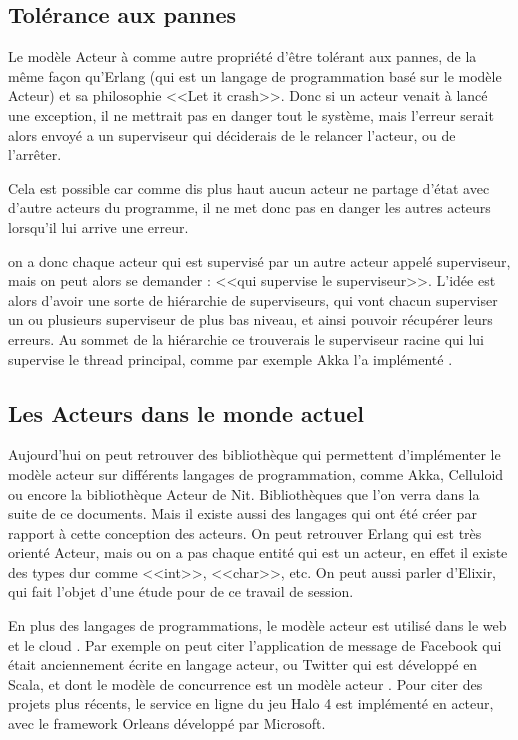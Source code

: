 \documentclass[12pt, a4paper]{article}
\begin{document}
\subsection{Tolérance aux pannes}
Le modèle Acteur à comme autre propriété d'être tolérant aux pannes, de la même façon qu'Erlang (qui est un langage de programmation basé sur le modèle Acteur) et sa philosophie <<Let it crash>>. Donc si un acteur venait à lancé une exception, il ne mettrait pas en danger tout le système, mais l'erreur serait alors envoyé a un superviseur qui déciderais de le relancer l'acteur, ou de l’arrêter.
\par Cela est possible car comme dis plus haut aucun acteur ne partage d'état avec d'autre acteurs du programme, il ne met donc pas en danger les autres acteurs lorsqu'il lui arrive une erreur.
\par on a donc chaque acteur qui est supervisé par un autre acteur appelé superviseur, mais on peut alors se demander : <<qui supervise le superviseur>>. L'idée est alors d'avoir une sorte de hiérarchie de superviseurs, qui vont chacun superviser un ou plusieurs superviseur de plus bas niveau, et ainsi pouvoir récupérer leurs erreurs. Au sommet de la hiérarchie ce trouverais le superviseur racine qui lui supervise le thread principal, comme par exemple Akka l'a implémenté \cite{akka}.

\subsection{Les Acteurs dans le monde actuel}
Aujourd'hui on peut retrouver des bibliothèque qui permettent d'implémenter le modèle acteur sur différents langages de programmation, comme Akka, Celluloid ou encore la bibliothèque Acteur de Nit. Bibliothèques que l'on verra dans la suite de ce documents. Mais il existe aussi des langages qui ont été créer par rapport à cette conception des acteurs. On peut retrouver Erlang qui est très orienté Acteur, mais ou on a pas chaque entité qui est un acteur, en effet il existe des types dur comme <<int>>, <<char>>, etc. On peut aussi parler d’Elixir, qui fait l'objet d'une étude pour de ce travail de session.
\par En plus des langages de programmations, le modèle acteur est utilisé dans le web et le cloud \cite{agha2014actors,vecchiola2009high}. Par exemple on peut citer l'application de message de Facebook qui était anciennement écrite en langage acteur, ou Twitter qui est développé en Scala, et dont le modèle de concurrence est un modèle acteur \cite{twitter_concurency}. Pour citer des projets plus récents, le service en ligne du jeu Halo 4 est implémenté en acteur, avec le framework Orleans développé par Microsoft.
\end{document}
